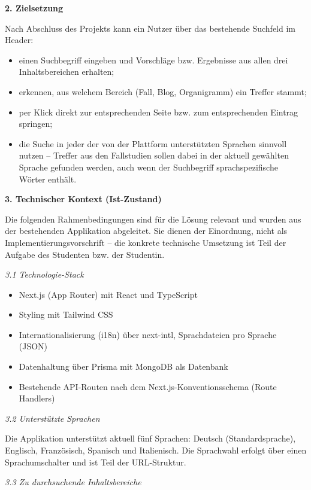 \documentclass[11pt,a4paper]{article}
\newcommand{\minihead}[1]{\par\needspace{5\baselineskip}\noindent\textbf{#1}\par\nobreak}
\newcommand{\miniheadit}[1]{\par\needspace{5\baselineskip}\noindent\textit{#1}\par\nobreak}
\begin{document}
\minihead{2. Zielsetzung}

Nach Abschluss des Projekts kann ein Nutzer über das bestehende Suchfeld im Header:
\begin{itemize}[nosep]
  \item einen Suchbegriff eingeben und Vorschläge bzw. Ergebnisse aus allen drei Inhaltsbereichen erhalten;
  \item erkennen, aus welchem Bereich (Fall, Blog, Organigramm) ein Treffer stammt;
  \item per Klick direkt zur entsprechenden Seite bzw. zum entsprechenden Eintrag springen;
  \item die Suche in jeder der von der Plattform unterstützten Sprachen sinnvoll nutzen – Treffer aus den Fallstudien sollen dabei in der aktuell gewählten Sprache gefunden werden, auch wenn der Suchbegriff sprachspezifische Wörter enthält.
\end{itemize}

\minihead{3. Technischer Kontext (Ist-Zustand)}

Die folgenden Rahmenbedingungen sind für die Lösung relevant und wurden aus der bestehenden Applikation abgeleitet. Sie dienen der Einordnung, nicht als Implementierungsvorschrift – die konkrete technische Umsetzung ist Teil der Aufgabe des Studenten bzw. der Studentin.

\miniheadit{3.1 Technologie-Stack}
\begin{itemize}[nosep]
  \item Next.js (App Router) mit React und TypeScript
  \item Styling mit Tailwind CSS
  \item Internationalisierung (i18n) über next-intl, Sprachdateien pro Sprache (JSON)
  \item Datenhaltung über Prisma mit MongoDB als Datenbank
  \item Bestehende API-Routen nach dem Next.js-Konventionsschema (Route Handlers)
\end{itemize}

\miniheadit{3.2 Unterstützte Sprachen}

Die Applikation unterstützt aktuell fünf Sprachen: Deutsch (Standardsprache), Englisch, Französisch, Spanisch und Italienisch. Die Sprachwahl erfolgt über einen Sprachumschalter und ist Teil der URL-Struktur.

\miniheadit{3.3 Zu durchsuchende Inhaltsbereiche}
\end{document}

